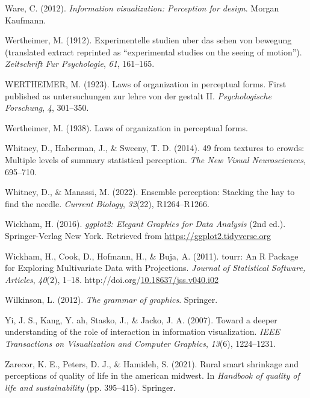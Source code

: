 \documentclass[print]{nuthesis}
\newlength{\cslhangindent}
\newenvironment{CSLReferences}[2]%
{\setlength{\parindent}{0pt}%
\everypar{\setlength{\hangindent}{\cslhangindent}}\ignorespaces}%
{\par}
\begin{document}
\begin{CSLReferences}{1}{0}
\leavevmode{}%
Ware, C. (2012). \emph{Information visualization: Perception for design}. Morgan Kaufmann.

\leavevmode{}%
Wertheimer, M. (1912). Experimentelle studien uber das sehen von bewegung (translated extract reprinted as {``experimental studies on the seeing of motion''}). \emph{Zeitschrift Fur Psychologie}, \emph{61}, 161--165.

\leavevmode{}%
WERTHEIMER, M. (1923). Laws of organization in perceptual forms. First published as untersuchungen zur lehre von der gestalt II. \emph{Psychologische Forschung}, \emph{4}, 301--350.

\leavevmode{}%
Wertheimer, M. (1938). Laws of organization in perceptual forms.

\leavevmode{}%
Whitney, D., Haberman, J., \& Sweeny, T. D. (2014). 49 from textures to crowds: Multiple levels of summary statistical perception. \emph{The New Visual Neurosciences}, 695--710.

\leavevmode{}%
Whitney, D., \& Manassi, M. (2022). Ensemble perception: Stacking the hay to find the needle. \emph{Current Biology}, \emph{32}(22), R1264--R1266.

\leavevmode{}%
Wickham, H. (2016). \emph{{ggplot2: Elegant Graphics for Data Analysis}} (2nd ed.). Springer-Verlag New York. Retrieved from \url{https://ggplot2.tidyverse.org}

\leavevmode{}%
Wickham, H., Cook, D., Hofmann, H., \& Buja, A. (2011). {tourr: An R Package for Exploring Multivariate Data with Projections}. \emph{Journal of Statistical Software, Articles}, \emph{40}(2), 1--18. http://doi.org/\href{https://doi.org/10.18637/jss.v040.i02}{10.18637/jss.v040.i02}

\leavevmode{}%
Wilkinson, L. (2012). \emph{The grammar of graphics}. Springer.

\leavevmode{}%
Yi, J. S., Kang, Y. ah, Stasko, J., \& Jacko, J. A. (2007). Toward a deeper understanding of the role of interaction in information visualization. \emph{IEEE Transactions on Visualization and Computer Graphics}, \emph{13}(6), 1224--1231.

\leavevmode{}%
Zarecor, K. E., Peters, D. J., \& Hamideh, S. (2021). Rural smart shrinkage and perceptions of quality of life in the american midwest. In \emph{Handbook of quality of life and sustainability} (pp. 395--415). Springer.

\end{CSLReferences}
\end{document}
